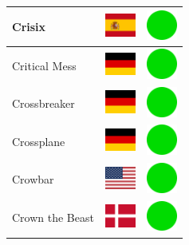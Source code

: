 \documentclass[12pt, a4paper, twoside]{report}
\begin{document}
\begin{center}
\begin{longtable}{|p{5cm}|p{2cm}|p{2cm}|}
 Crisix                                                     & \includegraphics[width=1cm]{../img/flags/es} &   \includegraphics[width=1cm]{../likes/y} \\ \hline
 Critical Mess                                              & \includegraphics[width=1cm]{../img/flags/de} &   \includegraphics[width=1cm]{../likes/y} \\ \hline
 Crossbreaker                                               & \includegraphics[width=1cm]{../img/flags/de} &   \includegraphics[width=1cm]{../likes/y} \\ \hline
 Crossplane                                                 & \includegraphics[width=1cm]{../img/flags/de} &   \includegraphics[width=1cm]{../likes/y} \\ \hline
 Crowbar                                                    & \includegraphics[width=1cm]{../img/flags/us} &   \includegraphics[width=1cm]{../likes/y} \\ \hline
 Crown the Beast                                            & \includegraphics[width=1cm]{../img/flags/dk} &   \includegraphics[width=1cm]{../likes/y} \\ \hline

\end{longtable}
\end{center}
\end{document}
